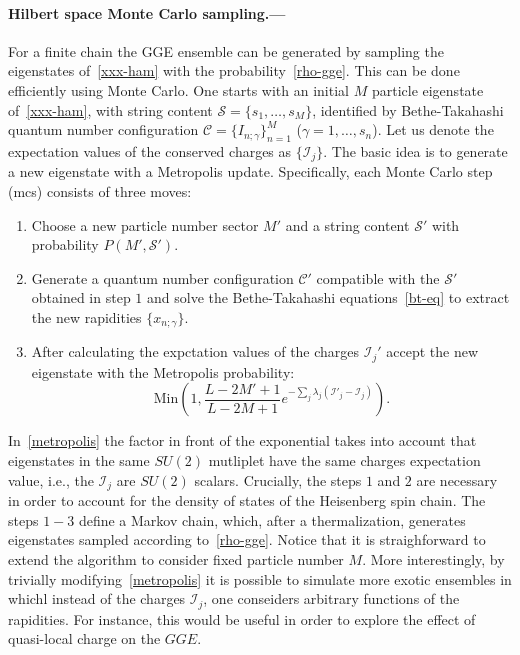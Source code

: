 \documentclass[twocolumn,superscriptaddress,prb,10pt]{revtex4-1}
\begin{document}
\paragraph*{Hilbert space Monte Carlo sampling.---}


For a finite chain the GGE ensemble can be generated by sampling the eigenstates 
of~\eqref{xxx-ham} with the probability~\eqref{rho-gge}. This can be done efficiently 
using Monte Carlo. One starts with an initial $M$ particle eigenstate of~\eqref{xxx-ham}, 
with string content ${\mathcal S}=\{s_1,\dots,s_M\}$, identified by 
Bethe-Takahashi quantum number configuration ${\mathcal C}=\{I_{n;\gamma}\}_{n=1}^M$ 
($\gamma=1,\dots,s_n$). Let us denote the expectation values of the conserved 
charges as $\{{\mathcal I_j}\}$. The basic idea is to generate a new eigenstate with a 
Metropolis update. Specifically, each Monte Carlo step (mcs) consists of three moves:
%
\begin{enumerate}
\item Choose a new particle number sector $M'$ and a string content ${\mathcal S}'$ 
 with probability $P(M',{\mathcal S}')$.
\item Generate a quantum number configuration ${\mathcal C}'$ compatible with 
 the ${\mathcal  S}'$ obtained in step $1$ and solve the Bethe-Takahashi 
 equations~\eqref{bt-eq} to extract the new rapidities $\{x_{n;\gamma}\}$. 
\item After calculating the expctation values of the charges ${\mathcal I}_j'$ 
 accept the new eigenstate with the Metropolis probability:
%
\begin{equation}
\label{metropolis}
\textrm{Min}\left(1,\frac{L-2M'+1}{L-2M+1}e^{-\sum_j\lambda_j({\mathcal I}'_j-
{\mathcal I}^{}_j)}\right).
\end{equation}
%
\end{enumerate}
%
In~\eqref{metropolis} the factor in front of the exponential takes into account 
that eigenstates in the same $SU(2)$ mutliplet have the same charges expectation 
value, i.e., the ${\mathcal I}_j$ are $SU(2)$ scalars. Crucially, the steps $1$ 
and $2$ are necessary in order to account for the density of states of the 
Heisenberg spin chain. The steps $1-3$ define a Markov chain, which, after a   
thermalization, generates eigenstates sampled according to~\eqref{rho-gge}. 
Notice that it is straighforward to extend the algorithm to consider fixed 
particle number $M$. More interestingly, by trivially modifying~\eqref{metropolis}
 it is possible to simulate more exotic ensembles in whichl instead of the charges 
${\mathcal I}_j$, one conseiders arbitrary functions of the rapidities. For instance, 
this would be useful in order to explore the effect of quasi-local charge on 
the $GGE$. 
\end{document}
